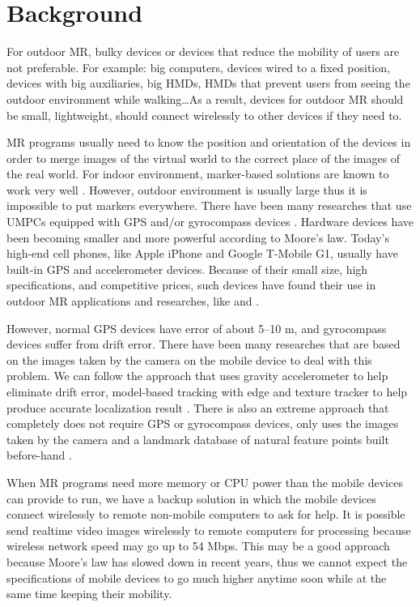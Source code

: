 
\section{Background}

For outdoor MR, bulky devices or devices that reduce the mobility of users are not preferable. For example: big computers, devices wired to a fixed position, devices with big auxiliaries, big HMDs, HMDs that prevent users from seeing the outdoor environment while walking\ldots As a result, devices for outdoor MR should be small, lightweight, should connect wirelessly to other devices if they need to.

MR programs usually need to know the position and orientation of the devices in order to merge images of the virtual world to the correct place of the images of the real world. For indoor environment, marker-based solutions are known to work very well \citep{Reference20}. However, outdoor environment is usually large thus it is impossible to put markers everywhere. There have been many researches that use UMPCs equipped with GPS and/or gyrocompass devices \citep{Reference2} \citep{Reference4} \citep{Reference13}. Hardware devices have been becoming smaller and more powerful according to Moore's law. Today's high-end cell phones, like Apple iPhone and Google T-Mobile G1, usually have built-in GPS and accelerometer devices. Because of their small size, high specifications, and competitive prices, such devices have found their use in outdoor MR applications and researches, like  \citep{Reference18} and  \citep{Reference19}.

However, normal GPS devices have error of about 5--10 m, and gyrocompass devices suffer from drift error. There have been many researches that are based on the images taken by the camera on the mobile device to deal with this problem. We can follow the approach that uses gravity accelerometer to help eliminate drift error, model-based tracking with edge and texture tracker to help produce accurate localization result \citep{Reference13}. There is also an extreme approach that completely does not require GPS or gyrocompass devices, only uses the images taken by the camera and a landmark database of natural feature points built before-hand \citep{Reference21}.

When MR programs need more memory or CPU power than the mobile devices can provide to run, we have a backup solution in which the mobile devices connect wirelessly to remote non-mobile computers to ask for help. It is possible send realtime video images wirelessly to remote computers for processing because wireless network speed may go up to 54 Mbps. This may be a good approach because Moore's law has slowed down in recent years, thus we cannot expect the specifications of mobile devices to go much higher anytime soon while at the same time keeping their mobility.
